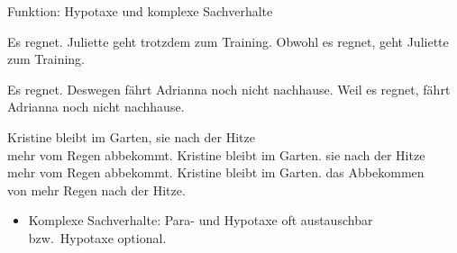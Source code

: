 \begin{frame}
  {Funktion: Hypotaxe und komplexe Sachverhalte}
  \pause
  \begin{exe}
    \ex\begin{xlist}
      \ex Es regnet. Juliette geht \alert{trotzdem} zum Training.
      \pause
      \ex \alert{Obwohl} es regnet, geht Juliette zum Training.
    \end{xlist}
    \Viertelzeile
    \pause
    \ex\begin{xlist}
      \ex Es regnet. \alert{Deswegen} fährt Adrianna noch nicht nachhause.
      \pause
      \ex \alert{Weil} es regnet, fährt Adrianna noch nicht nachhause.
    \end{xlist}
    \pause
    \Viertelzeile
    \ex\begin{xlist}
      \ex Kristine bleibt im Garten,  sie nach der Hitze\\
      mehr vom Regen abbekommt.
      \pause
      \ex Kristine bleibt im Garten.  sie nach der Hitze\\
      mehr vom Regen abbekommt.
      \pause
      \ex Kristine bleibt im Garten.  das Abbekommen\\
      von mehr Regen nach der Hitze.
    \end{xlist}
  \end{exe}
  \pause
  \begin{itemize}[<+->]
    \item Komplexe Sachverhalte: \alert{Para- und Hypotaxe} oft austauschbar\\
       bzw.\ \alert{Hypotaxe optional}.
  \end{itemize}
\end{frame}

